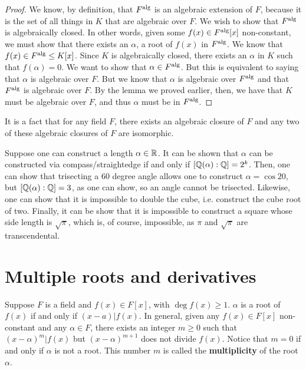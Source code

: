 \documentclass{../mathnotes}
\begin{document}
\begin{proof}
    We know, by definition, that $F^{\rm alg}$ is an algebraic extension of $F$, because it is the set of all things in $K$
    that are algebraic over $F$. We wish to show that $F^{\rm alg}$ is algebraically closed. In other words, given some 
    $f(x)\in F^{\rm alg}[x]$ non-constant, we must show that there exists an $\alpha$, a root of $f(x)$ in $F^{\rm alg}$.
    We know that $f(x)\in F^{\rm alg}\leq K[x]$. Since $K$ is algebraically closed, there exists an $\alpha$ in $K$ such that
    $f(\alpha)=0$. We want to show that $\alpha\in F^{\rm alg}$. But this is equivalent to saying that $\alpha$ is algebraic
    over $F$. But we know that $\alpha$ is algebraic over $F^{\rm alg}$ and that $F^{\rm alg}$ is algebraic over $F$. By the lemma
    we proved earlier, then, we have that $K$ must be algebraic over $F$, and thus $\alpha$ must be in $F^{\rm alg}$.
\end{proof}

\begin{rem}
    It is a fact that for any field $F$, there exists an algebraic closure of $F$ and any two of these algebraic closures of $F$ are isomorphic.
\end{rem}

\begin{rem}
Suppose one can construct a length $\alpha\in\mathbb{R}$. It can be shown that $\alpha$ can be constructed via compass/straightedge 
if and only if $[\mathbb{Q}(\alpha):\mathbb{Q}]=2^k$.
Then, one can show that trisecting a 60 degree angle allows one to construct $\alpha=\cos 20$, but $[\mathbb{Q}(\alpha):\mathbb{Q}]=3$, as one can show,
so an angle cannot be trisected.
Likewise, one can show that it is impossible to double the cube, i.e. construct the cube root of two. Finally, it can be show that it is
impossible to construct a square whose side length is $\sqrt{\pi}$, which is, of course, impossible, as $\pi$ and $\sqrt{\pi}$ are transcendental.
\end{rem}

\section{Multiple roots and derivatives}

Suppose $F$ is a field and $f(x)\in F[x]$, with $\deg f(x)\geq 1$. $\alpha$ is a root of $f(x)$ if and only if $(x-a)|f(x)$.
In general, given any $f(x)\in F[x]$ non-constant and any $\alpha\in F$, there exists an integer $m\geq0$ such that $(x-\alpha)^m|f(x)$
but $(x-\alpha)^{m+1}$ does not divide $f(x)$. Notice that $m=0$ if and only if $\alpha$ is not a root. This number $m$ is called the
\textbf{multiplicity} of the root $\alpha$.
\end{document}
